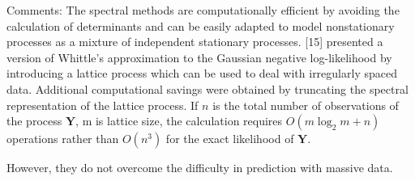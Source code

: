 \documentclass[
12pt, %
a4paper, %
oneside, %
headinclude,footinclude, %
BCOR5mm, %
]{scrartcl}
\begin{document}
\textcolor[rgb]{1.00,0.00,1.00}{Comments:}
The spectral methods are computationally efficient by avoiding the calculation of determinants and can be easily adapted to model nonstationary processes as a mixture of independent stationary processes. [15] presented a version of Whittle’s approximation to the Gaussian
negative log-likelihood by introducing a lattice process which can be used to deal with irregularly spaced data. Additional computational savings were obtained by truncating the spectral representation of the lattice process. If $n$ is the total number of observations of the process $\boldsymbol{Y}$, m is lattice size, the calculation requires $O(m \log_2 m + n)$ operations rather than $O(n^3)$ for the exact likelihood of $\boldsymbol{Y}$.

However, they do not overcome the difficulty in prediction with massive data.



\end{document}
